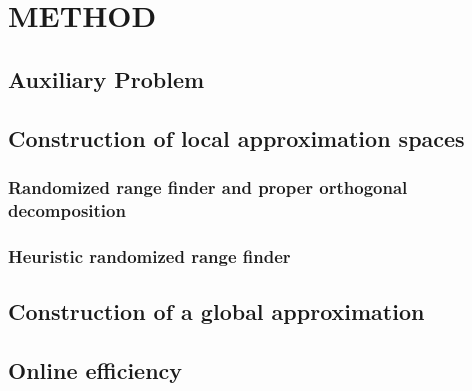 \documentclass[a4paper]{eccomas_paper-2024}
\begin{document}

\section{METHOD}%
\label{sec:method}

\subsection{Auxiliary Problem} %
\label{sub:Auxiliary Problem}


\subsection{Construction of local approximation spaces} %
\label{sub:Construction of local approximation spaces}


\subsubsection{Randomized range finder and proper orthogonal decomposition} %
\label{sec:Randomized range finder and POD}


\subsubsection{Heuristic randomized range finder} %
\label{sec:Heuristic randomized range finder}


\subsection{Construction of a global approximation} %
\label{sub:Construction of a global approximation}


\subsection{Online efficiency} %
\label{sub:Online efficiency}
\end{document}
